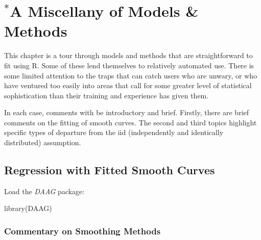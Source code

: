 \documentclass{tufte-book}\usepackage[]{graphicx}\usepackage[]{color}
\newcommand{\txtt}[1]{\texttt{#1}}
\begin{document}
\begin{enumerate}
\end{enumerate}
% 
\cleartooddpage

\chapter[A Miscellany of Models \& Methods]{$^*$A Miscellany of Models \& Methods}





This chapter is a tour through models and methods that are
straightforward to fit using R.  Some of these lend themselves
to relatively automated use.   There is some limited attention
to the traps that can catch users who are unwary, or who have
ventured too easily into areas that call for some greater level
of statistical sophistication than their training and experience
has given them.

In each case, comments with be introductory and brief.  Firstly, there
are brief comments on the fitting of smooth curves.  The second and
third topics highlight specific types of departure from the iid
(independently and identically distributed) assumption.

\section{Regression with Fitted Smooth Curves}

Load the {\em DAAG} package:
\begin{Schunk}
\begin{Sinput}
library(DAAG)
\end{Sinput}
\end{Schunk}

\subsection*{Commentary  on Smoothing Methods}
\end{document}
